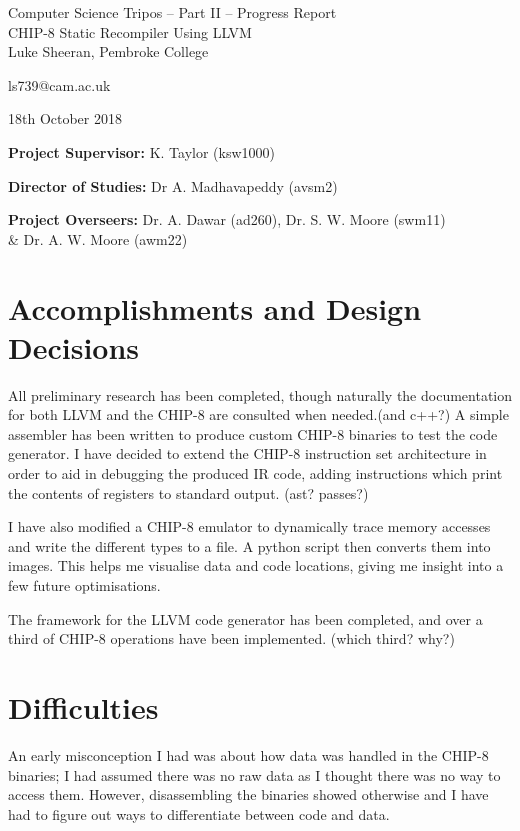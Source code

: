 \documentclass[12pt,a4paper,twoside]{article}
\begin{document}
\begin{center}
\Large
Computer Science Tripos -- Part II -- Progress Report\\[4mm]
\LARGE
CHIP-8 Static Recompiler Using LLVM\\[4mm]

\large
Luke Sheeran, Pembroke College

ls739@cam.ac.uk

18th October 2018
\end{center}

\vspace{5mm}

\textbf{Project Supervisor:} K. Taylor (ksw1000)

\textbf{Director of Studies:} Dr A. Madhavapeddy (avsm2)

\textbf{Project Overseers:} Dr. A. Dawar (ad260), Dr. S. W. Moore (swm11) \\\& Dr. A. W. Moore (awm22)



\section*{Accomplishments and Design Decisions}
All preliminary research has been completed, though naturally the documentation for both LLVM and the CHIP-8 are consulted when needed.(and c++?) A simple assembler has been written to produce custom CHIP-8 binaries to test the code generator. I have decided to extend the CHIP-8 instruction set architecture in order to aid in debugging the produced IR code, adding instructions which print the contents of registers to standard output.
(ast? passes?)

I have also modified a CHIP-8 emulator to  dynamically trace memory accesses and write the different types to a file. A python script then converts them into images. This helps me visualise data and code locations, giving me insight into a few future optimisations.

The framework for the LLVM code generator has been completed, and over a third of CHIP-8 operations have been implemented. (which third? why?)

\section*{Difficulties}
An early misconception I had was about how data was handled in the CHIP-8 binaries; I had assumed there was no raw data as I thought there was no way to access them. However, disassembling the binaries showed otherwise and I have had to figure out ways to differentiate between code and data.
\end{document}
